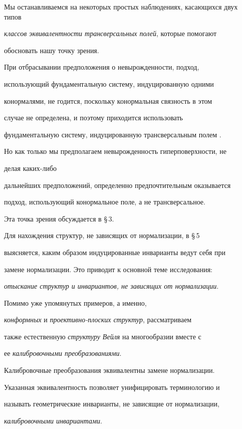 Мы останавливаемся на некоторых простых наблюдениях, касающихся двух типов


{\it классов эквивалентности трансверсальных полей}, которые помогают


обосновать нашу точку зрения.


При отбрасывании предположения о невырожденности, подход,


использующий фундаментальную систему, индуцированную одними


конормалями, не годится, поскольку конормальная связность в этом


случае не определена, и поэтому приходится использовать


фундаментальную систему, индуцированную трансверсальным полем \cite{OPO}.


Но как только мы предполагаем невырожденность гиперповерхности, не


делая каких-либо


дальнейших предположений, определенно предпочтительным оказывается


подход, использующий конормальное поле, а не трансверсальное.


Эта точка зрения обсуждается в \S\,3.





Для нахождения структур, не зависящих от нормализации, в \S\,5


выясняется, каким образом индуцированные инварианты ведут себя при


замене нормализации. Это приводит к основной теме исследования:


{\it отыскание структур и инвариантов, не зависящих от нормализации}.





Помимо уже упомянутых примеров, а именно,


{\it конформных} и {\it проективно-плоских структур}, рассматриваем


также естественную {\it структуру Вейля} на многообразии вместе с


ее {\it калибровочными преобразованиями}.


Калибровочные преобразования эквивалентны замене нормализации.


Указанная эквивалентность позволяет унифицировать терминологию и


называть геометрические инварианты, не зависящие от нормализации,


{\it калибровочными инвариантами}.


